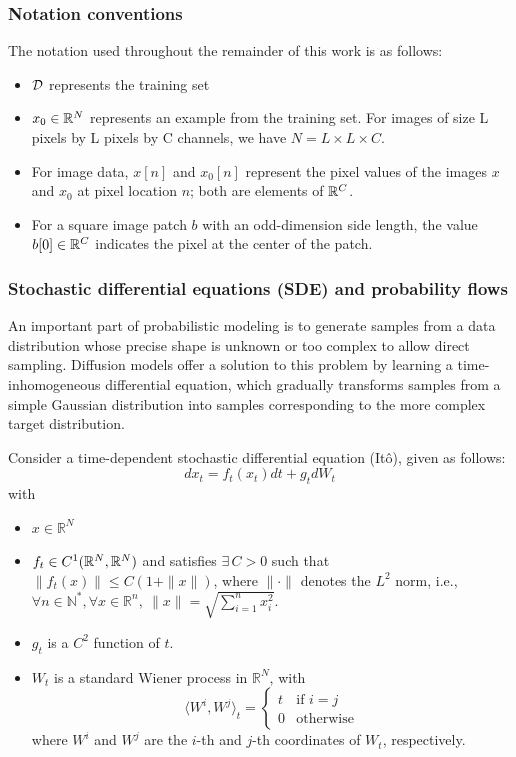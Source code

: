 \documentclass[a4paper,10pt]{article}
\begin{document}
\subsubsection{Notation conventions}
The notation used throughout the remainder of this work is as follows:
\begin{itemize}
    \item $\mathcal{D}$ represents the training set
    \item $x_0\in\mathbb{R}^N$ represents an example from the training set. For images of size L pixels by L pixels by C channels, we have $N=L\times L \times C$.
    \item For image data, $x[n]$ and $x_0[n]$ represent the pixel values of the images $x$ and $x_0$ at pixel location $n$; both are elements of $\mathbb{R}^C$.
    \item For a square image patch $b$ with an odd-dimension side length, the value $b[0] \in \mathbb{R}^C$ indicates the pixel at the center of the patch.
\end{itemize}
\subsubsection{Stochastic differential equations (SDE) and probability flows}

An important part of probabilistic modeling is to generate samples from a data distribution whose precise shape is unknown or too complex to allow direct sampling. Diffusion models offer a solution to this problem by learning a time-inhomogeneous differential equation, which gradually transforms samples from a simple Gaussian distribution into samples corresponding to the more complex target distribution.

Consider a time-dependent stochastic differential equation (Itô), given as follows:
    \begin{equation}\label{eq:SDE}
         dx_t = f_t(x_t)dt + g_tdW_t
    \end{equation}
    with 
    \begin{itemize}
        \item $x \in \mathbb{R}^N$
        \item $f_t \in C^1(\mathbb{R}^N,\mathbb{R}^N)$ and satisfies $\exists\, C > 0$ such that $\|f_t(x)\| \leq C(1 + \|x\|)$, where $\|\cdot\|$ denotes the $L^2$ norm, i.e., $\forall n \in \mathbb{N}^*, \forall x \in \mathbb{R}^n,\ \|x\| = \sqrt{\sum\limits_{i=1}^n x_i^2}$.
        \item $g_t$ is a $C^2$ function of $t$.
        \item $W_t$ is a standard Wiener process in $\mathbb{R}^N$, with
        \begin{equation*}
            \langle W^i, W^j \rangle_t =
            \begin{cases}
                t & \text{if } i = j \\
                0 & \text{otherwise}
            \end{cases}
        \end{equation*}
        where $W^i$ and $W^j$ are the $i$-th and $j$-th coordinates of $W_t$, respectively.
    \end{itemize}
    
\end{document}
